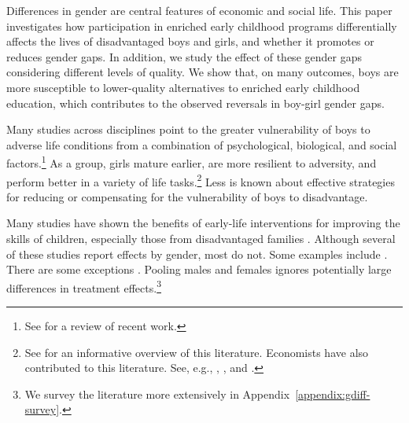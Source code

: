 Differences in gender are central features of economic and social life. This paper investigates how participation in enriched early childhood programs differentially affects the lives of disadvantaged boys and girls, and whether it promotes or reduces gender gaps. In addition, we study the effect of these gender gaps considering different levels of quality. We show that, on many outcomes, boys are more susceptible to lower-quality alternatives to enriched early childhood education, which contributes to the observed reversals in boy-girl gender gaps. 

Many studies across disciplines point to the greater vulnerability of boys to adverse life conditions from a combination of psychological, biological, and social factors.\footnote{See \citet{Golding_Fitzgerald_2017_IMHJ} for a review of recent work.} As a group, girls mature earlier, are more resilient to adversity, and perform better in a variety of life tasks.\footnote{See \citet{Schore_2017_IMHJ} for an informative overview of this literature. Economists have also contributed to this literature. See, e.g., \citet{Bertrand_Pan_2013_AEJAE}, \citet{Kottelenberg_Lehrer_2014_Gender-Effects}, and \citet{Autor-etal_2015_Family-Disadvantage}.} Less is known about effective strategies for reducing or compensating for the vulnerability of boys to disadvantage.

Many studies have shown the benefits of early-life interventions for improving the skills of children, especially those from disadvantaged families \citep{Currie_2011_AER,Elango_Hojman_etal_2016_Early-Edu}. Although several of these studies report effects by gender, most do not. Some examples include \citet{Bernal_Keane_2011_JoLE,Cascio_Schanzenbach_2013_ImpactsExpandingAccess,Bitler_et_al_2014_Head_Start_Unpublished,Kline_Walters_2016_QJE}. There are some exceptions \citep{Heckman_Moon_etal_2010_QE,Campbell_Conti_etal_2014_EarlyChildhoodInvestments,Garcia_Heckman_Leaf_etal_2017_Comp_CBA_Unpublished}. Pooling males and females ignores potentially large differences in treatment effects.\footnote{We survey the literature more extensively in Appendix~\ref{appendix:gdiff-survey}.}

